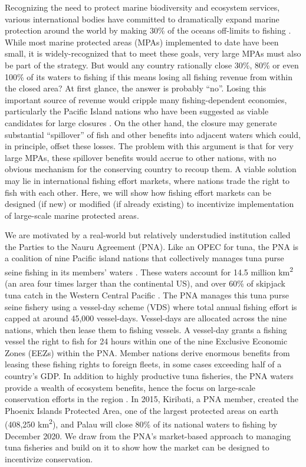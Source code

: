 \documentclass[12pt]{article}
\begin{document}
Recognizing the need to protect marine biodiversity and ecosystem services, various international bodies have committed to dramatically expand marine protection around the world by making 30\% of the oceans off-limits to fishing \cite{oleary_2016,dinerstein_2019}. While most marine protected areas (MPAs) implemented to date have been small, it is widely-recognized that to meet these goals, very large MPAs must also be part of the strategy. But would any country rationally close 30\%, 80\% or even 100\% of its waters to fishing if this means losing all fishing revenue from within the closed area? At first glance, the answer is probably ``no''. Losing this important source of revenue would cripple many fishing-dependent economies, particularly the Pacific Island nations who have been suggested as viable candidates for large closures \cite{mcleod_2019}. On the other hand, the closure may generate substantial ``spillover'' of fish and other benefits into adjacent waters which could, in principle, offset these losses. The problem with this argument is that for very large MPAs, these spillover benefits would accrue to other nations, with no obvious mechanism for the conserving country to recoup them. A viable solution may lie in international fishing effort markets, where nations trade the right to fish with each other. Here, we will show how fishing effort markets can be designed (if new) or modified (if already existing) to incentivize implementation of large-scale marine protected areas.

We are motivated by a real-world but relatively understudied institution called the Parties to the Nauru Agreement (PNA). Like an OPEC for tuna, the PNA is a coalition of nine Pacific island nations that collectively manages tuna purse seine fishing in its members' waters \cite{havice_2013,aqorau_2018}. These waters account for 14.5 million km\textsuperscript{2} (an area four times larger than the continental US), and over 60\% of skipjack tuna catch in the Western Central Pacific \cite{havice_2013}. The PNA manages this tuna purse seine fishery using a vessel-day scheme (VDS) where total annual fishing effort is capped at around 45,000 vessel-days. Vessel-days are allocated across the nine nations, which then lease them to fishing vessels. A vessel-day grants a fishing vessel the right to fish for 24 hours within one of the nine Exclusive Economic Zones (EEZs) within the PNA. Member nations derive enormous benefits from leasing these fishing rights to foreign fleets, in some cases exceeding half of a country's GDP. In addition to highly productive tuna fisheries, the PNA waters provide a wealth of ecosystem benefits, hence the focus on large-scale conservation efforts in the region \cite{mcleod_2019}. In 2015, Kiribati, a PNA member, created the Phoenix Islands Protected Area, one of the largest protected areas on earth (408,250 km\textsuperscript{2}), and Palau will close 80\% of its national waters to fishing by December 2020. We draw from the PNA's market-based approach to managing tuna fisheries and build on it to show how the market can be designed to incentivize conservation.
\end{document}
